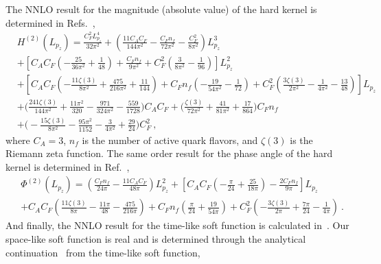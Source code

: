 \documentclass[a4paper,11pt]{article}
\begin{document}
The NNLO result for the magnitude (absolute value) of the hard kernel is determined in Refs.~\cite{Ji:2023pba,delRio:2023pse},
\begin{align}
&H^{(2)}(L_{p_z}) = \frac{C_F^2 L_{p_z}^4}{32 \pi ^2} + \left(\frac{11 C_A C_F}{144 \pi ^2}-\frac{C_F n_f}{72 \pi ^2}-\frac{C_F^2}{8 \pi^2}\right) L_{p_z}^3 \nonumber\\ 
&+ \left[ C_A C_F \left(-\frac{25}{36 \pi ^2}+\frac{1}{48} \right) +\frac{C_F n_f}{9 \pi ^2} + C_F^2 \left(\frac{3}{8 \pi ^2}-\frac{1}{96}\right) \right] L_{p_z}^2 \nonumber\\
&+ \left[C_A C_F \left(-\frac{11 \zeta(3) }{8 \pi ^2}+\frac{475}{216 \pi ^2}+\frac{11}{144}\right)
+C_F n_f \left(-\frac{19}{54 \pi ^2}-\frac{1}{72}\right)
+C_F^2\left(\frac{3 \zeta(3)}{2 \pi^2}-\frac{1}{4 \pi ^2}-\frac{13}{48}\right)\right] L_{p_z} \nonumber\\
& +\bigg(\frac{241 \zeta(3)}{144 \pi ^2}+\frac{11 \pi^2}{320} -\frac{971 }{324\pi ^2}-\frac{559 }{1728}\bigg)C_A C_F+\bigg(\frac{\zeta(3) }{72 \pi ^2}+\frac{41 }{81 \pi^2}+\frac{17 }{864}\bigg) C_F n_f\nonumber\\
&+\bigg(-\frac{15 \zeta(3)}{8 \pi ^2}-\frac{95 \pi^2 }{1152}-\frac{3 }{4 \pi ^2}+\frac{29 }{24}\bigg)C_F^2 \ , 
\end{align}
where $C_A = 3$, $n_f$ is the number of active quark flavors, and $\zeta(3)$ is the Riemann zeta function.
The same order result for the phase angle of the hard kernel is determined in Ref.~\cite{Ji:2023pba},
\begin{align}
&\Phi^{(2)}(L_{p_z}) = \left(\frac{C_F n_f}{24 \pi }-\frac{11 C_A C_F}{48 \pi }\right) L_{p_z}^2 
+ \left[C_A C_F \left(-\frac{\pi}{24}+\frac{25}{18 \pi }\right)-\frac{2 C_F n_f}{9 \pi }\right] L_{p_z} \nonumber\\
&+ C_A C_F \left(\frac{11 \zeta(3) }{8 \pi }-\frac{11 \pi}{48} -\frac{475}{216 \pi}\right)
+  C_F n_f \left(\frac{\pi}{24} + \frac{19}{54 \pi }\right)
+ C_F^2\left(-\frac{3 \zeta(3) }{2 \pi}+\frac{7 \pi}{24}-\frac{1}{4 \pi }\right) \ .
\end{align}
And finally, the NNLO result for the time-like soft function is calculated in~\cite{Jain:2008gb}. Our space-like soft function is real and is determined through the analytical continuation~\cite{Ji:2023pba} from the time-like soft function,
\end{document}

